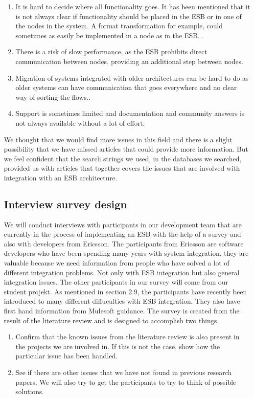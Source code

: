 \documentclass{llncs}
\begin{document}
\begin{enumerate}
\item It is hard to decide where all functionality goes. It has been mentioned that it is not always clear if functionality should be placed in the ESB or in one of the nodes in the system. A format transformation for example, could sometimes as easily be implemented in a node as in the ESB.  \cite{ortiz07}.
\item There is a risk of slow performance, as the ESB prohibits direct communication between nodes, providing an additional step between nodes.
\item Migration of systems integrated with older architectures can be hard to do as older systems can have communication that goes everywhere and no clear way of sorting the flows.\cite{ortiz07}.
\item Support is sometimes limited and documentation and community answers is not always available without a lot of effort.
\end{enumerate}

We thought that we would find more issues in this field and there is a slight possibility that we have missed articles that could provide more information. But we feel confident that the search strings we used, in the databases we searched, provided us with articles that together covers the issues that are involved with integration with an ESB architecture.

\subsection{Interview survey design}

We will conduct interviews with participants in our development team that are currently in the process of implementing an ESB with the help of a survey and also with developers from Ericsson. The participants from Ericsson are software developers who have been spending many years with system integration, they are valuable because we need information from people who have solved a lot of different integration problems. Not only with ESB integration but also general integration issues. The other participants in our survey will come from our student projekt. As mentioned in section 2.9, the participants have recently been introduced to many different diffuculties with ESB integration. They also have first hand information from Mulesoft guidance.
The survey is created from the result of the literature review and is designed to accomplish two things.
\begin{enumerate}
\item Confirm that the known issues from the literature review is also present in the projects we are involved in. If this is not the case, show how the particular issue has been handled.
\item See if there are other issues that we have not found in previous research papers. We will also try to get the participants to try to think of possible solutions.
\end{enumerate}
\end{document}
